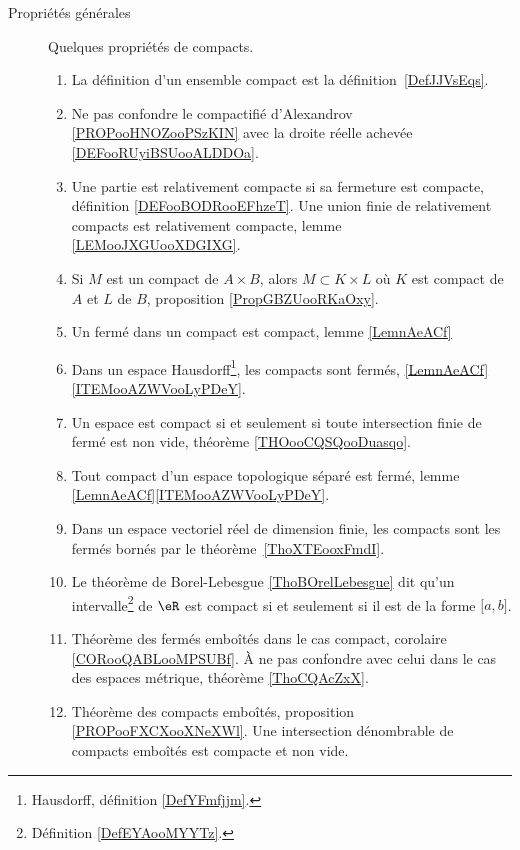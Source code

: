         \label{THEMEooQQBHooLcqoKB}
\begin{description}

	\item[Propriétés générales]

		Quelques propriétés de compacts.

		\begin{enumerate}
			\item
			      La définition d'un ensemble compact est la définition~\ref{DefJJVsEqs}.
			\item
			      Ne pas confondre le compactifié d'Alexandrov \ref{PROPooHNOZooPSzKIN} avec la droite réelle achevée \ref{DEFooRUyiBSUooALDDOa}.
			\item
			      Une partie est relativement compacte si sa fermeture est compacte, définition \ref{DEFooBODRooEFhzeT}. Une union finie de relativement compacts est relativement compacte, lemme \ref{LEMooJXGUooXDGIXG}.
			\item
			      Si \( M\) est un compact de \( A\times B\), alors \( M\subset K\times L\) où \( K\) est compact de \( A\) et \( L\) de \( B\), proposition \ref{PropGBZUooRKaOxy}.
			\item
			      Un fermé dans un compact est compact, lemme \ref{LemnAeACf}
			\item
			      Dans un espace Hausdorff\footnote{Hausdorff, définition \ref{DefYFmfjjm}.}, les compacts sont fermés, \ref{LemnAeACf}\ref{ITEMooAZWVooLyPDeY}.
			\item
			      Un espace est compact si et seulement si toute intersection finie de fermé est non vide, théorème \ref{THOooCQSQooDuasqo}.
			\item
			      Tout compact d'un espace topologique séparé est fermé, lemme \ref{LemnAeACf}\ref{ITEMooAZWVooLyPDeY}.
			\item
			      Dans un espace vectoriel réel de dimension finie, les compacts sont les fermés bornés par le théorème~\ref{ThoXTEooxFmdI}.
			\item
			      Le théorème de Borel-Lebesgue \ref{ThoBOrelLebesgue} dit qu'un intervalle\footnote{Définition \ref{DefEYAooMYYTz}.} de \( \eR\) est compact si et seulement si il est de la forme \( \mathopen[ a , b \mathclose]\).
			\item
			      Théorème des fermés emboîtés dans le cas compact, corolaire \ref{CORooQABLooMPSUBf}. À ne pas confondre avec celui dans le cas des espaces métrique, théorème \ref{ThoCQAcZxX}.
			\item
			      Théorème des compacts emboîtés, proposition \ref{PROPooFXCXooXNeXWl}. Une intersection dénombrable de compacts emboîtés est compacte et non vide.

\end{enumerate}
\end{description}
